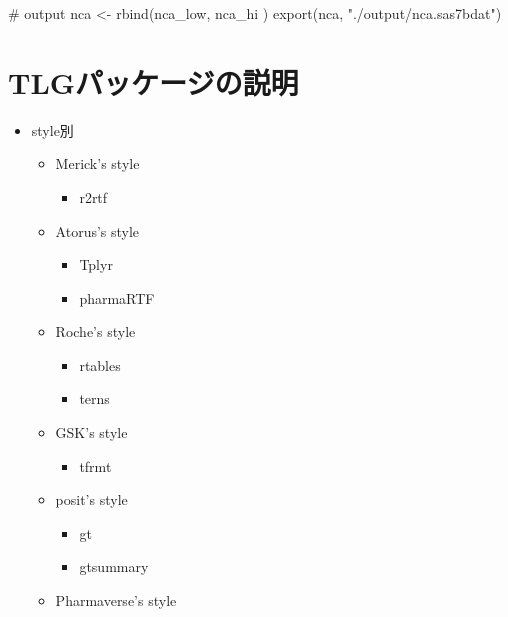 \documentclass[
  letterpaper,
  DIV=11,
  numbers=noendperiod]{scrreprt}
\newenvironment{Shaded}{\begin{snugshade}}{\end{snugshade}}
\newcommand{\CommentTok}[1]{\textcolor[rgb]{0.37,0.37,0.37}{#1}}
\newcommand{\FunctionTok}[1]{\textcolor[rgb]{0.28,0.35,0.67}{#1}}
\newcommand{\NormalTok}[1]{\textcolor[rgb]{0.00,0.23,0.31}{#1}}
\newcommand{\OtherTok}[1]{\textcolor[rgb]{0.00,0.23,0.31}{#1}}
\newcommand{\StringTok}[1]{\textcolor[rgb]{0.13,0.47,0.30}{#1}}
\providecommand{\tightlist}{%
  \setlength{\itemsep}{0pt}\setlength{\parskip}{0pt}}\usepackage{longtable,booktabs,array}
\begin{document}
\begin{Shaded}
\begin{Highlighting}[]
\CommentTok{\# output}
\NormalTok{nca }\OtherTok{\textless{}{-}} \FunctionTok{rbind}\NormalTok{(nca\_low, nca\_hi )}
\FunctionTok{export}\NormalTok{(nca, }\StringTok{"./output/nca.sas7bdat"}\NormalTok{)}
\end{Highlighting}
\end{Shaded}


\hypertarget{tlgux30d1ux30c3ux30b1ux30fcux30b8ux306eux8aacux660e}{%
\chapter{TLGパッケージの説明}\label{tlgux30d1ux30c3ux30b1ux30fcux30b8ux306eux8aacux660e}}

\begin{itemize}
\item
  style別

  \begin{itemize}
  \tightlist
  \item
    Merick's style

    \begin{itemize}
    \tightlist
    \item
      r2rtf
    \end{itemize}
  \item
    Atorus's style

    \begin{itemize}
    \tightlist
    \item
      Tplyr
    \item
      pharmaRTF
    \end{itemize}
  \item
    Roche's style

    \begin{itemize}
    \tightlist
    \item
      rtables
    \item
      terns
    \end{itemize}
  \item
    GSK's style

    \begin{itemize}
    \tightlist
    \item
      tfrmt
    \end{itemize}
  \item
    posit's style

    \begin{itemize}
    \tightlist
    \item
      gt
    \item
      gtsummary
    \end{itemize}
  \item
    Pharmaverse's style


\end{itemize}
\end{itemize}
\end{document}
